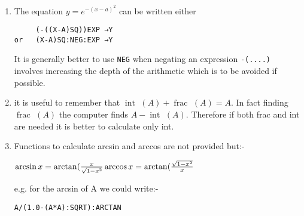 \documentclass[10pt, a4paper, oneside]{article}
\newcommand{\mytt}[1]{\texttt{\scriptsize #1}}
\newcommand{\mytt}[1]{\texttt{\small #1}}
\DeclareMathOperator{\Int}{int\ }
\DeclareMathOperator{\Frac}{frac\ }
\begin{document}
\begin{multicols}{2}
\begin{enumerate}
\begin{flushleft}
but more economical to write:
\end{flushleft}

\begin{addmargin}[1cm]{1em}%
\begin{lstlisting}
((X:EXP →Y)*(1.0/Y))/2 →Y
\end{lstlisting}
\end{addmargin}

\begin{flushleft}
Note the use of $y$ as an intermediate store for $e^{x}$, which
which avoids calculating an exponential more often than necessary.
\end{flushleft}

\item The equation $y=e^{-(x-a)^{2}}$ can be written either

\begin{addmargin}[1em]{1em}%
\begin{lstlisting}
     (-((X-A)SQ))EXP →Y
or   (X-A)SQ:NEG:EXP →Y
\end{lstlisting}
\end{addmargin}

\begin{flushleft}
It is generally better to use \mytt{NEG} when negating an
expression \mytt{-(....)} involves increasing the depth
of the arithmetic which is to be avoided if possible.
\end{flushleft}

\item it is useful to remember that $\Int (A) + \Frac (A) = A$.
In fact finding $\Frac (A)$ the computer finds $A - \Int (A)$.
Therefore if both frac and int are needed it is better to calculate only int.

\item Functions to calculate arcsin and arccos are not provided
but:-

\begin{addmargin}[1cm]{1em}%
\begin{math}
\arcsin x = \arctan(\frac{x}{\sqrt{1-x^{2}}} \\
\arccos x = \arctan(\frac{\sqrt{1-x^{2}}}{x}
\end{math}
\end{addmargin}

e.g. for the arcsin of A we could write:-

\begin{addmargin}[1cm]{1em}%
\begin{lstlisting}
A/(1.0-(A*A):SQRT):ARCTAN
\end{lstlisting}
\end{addmargin}


\end{enumerate}
\end{multicols}
\end{document}
